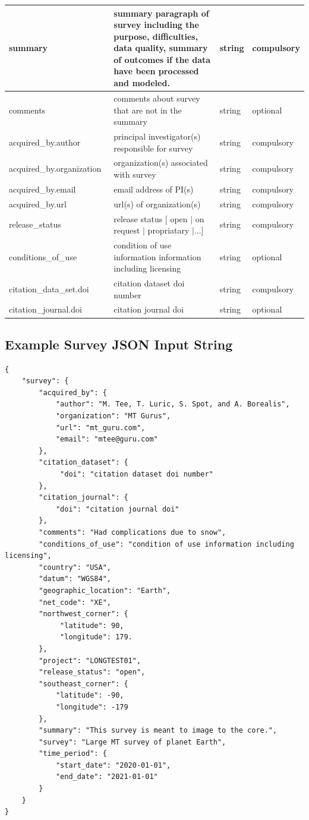 \documentclass{article}
\begin{document}
\begin{table}[htb!]
\begin{tabular}{|l|p{3.65in}|l|l|}
		summary\ & summary paragraph of survey including the purpose, difficulties, data quality, summary of outcomes if the data have been processed and modeled. & string & compulsory \\ \hline
		comments\ & comments about survey that are not in the summary & string & optional \\ \hline
		acquired\_by.author\ & principal investigator(s) responsible for survey & string & compulsory \\ \hline
		acquired\_by.organization\ & organization(s) associated with survey & string & compulsory \\ \hline
		acquired\_by.email\ & email address of PI(s) & string & compulsory \\ \hline
		acquired\_by.url\ & url(s) of organization(s) & string & compulsory \\ \hline
		release\_status\ & release status [ open $|$ on request $|$ propriatary $|$...] & string & compulsory \\ \hline
		conditions\_of\_use\ & condition of use information information including licensing & string & optional \\ \hline
		citation\_data\_set.doi & citation dataset doi number & string & compulsory \\ \hline
		citation\_journal.doi & citation journal doi & string & optional \\ \hline
	\end{tabular}
	\label{tab:survey}
\end{table} 

\newpage
\subsection{Example Survey JSON Input String}

\begin{verbatim}
{
    "survey": {
        "acquired_by": {
            "author": "M. Tee, T. Luric, S. Spot, and A. Borealis",
            "organization": "MT Gurus",
            "url": "mt_guru.com",
            "email": "mtee@guru.com"
        },
        "citation_dataset": {
             "doi": "citation dataset doi number"
        },
        "citation_journal": {
            "doi": "citation journal doi"
        },
        "comments": "Had complications due to snow",
        "conditions_of_use": "condition of use information including licensing",
        "country": "USA",
        "datum": "WGS84",
        "geographic_location": "Earth",
        "net_code": "XE",
        "northwest_corner": {
             "latitude": 90,
             "longitude": 179.
        },
        "project": "LONGTEST01",
        "release_status": "open",
        "southeast_corner": {
            "latitude": -90,
            "longitude": -179
        },
        "summary": "This survey is meant to image to the core.",
        "survey": "Large MT survey of planet Earth",
        "time_period": {
            "start_date": "2020-01-01",
            "end_date": "2021-01-01"
        }
    }
}
\end{verbatim}
\end{document}
